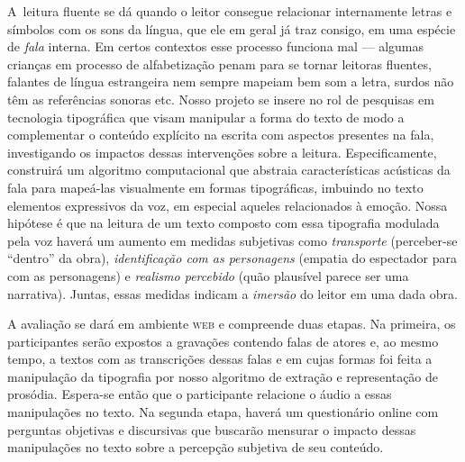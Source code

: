 \documentclass[a4paper,11pt,titlepage,singlespacing]{article}
\begin{document}
\newpage

\abstract

\noindent A~leitura fluente se dá quando o leitor consegue relacionar internamente letras e símbolos com os sons da língua, que ele em geral já traz consigo, em uma espécie de \textit{fala} interna. Em certos contextos esse processo funciona mal — algumas crianças em processo de alfabetização penam para se tornar leitoras fluentes, falantes de língua estrangeira nem sempre mapeiam bem som a letra, surdos não têm as referências sonoras etc. Nosso projeto se insere no rol de pesquisas em tecnologia tipográfica que visam manipular a forma do texto de modo a complementar o conteúdo explícito na escrita com aspectos presentes na fala, investigando os impactos dessas intervenções sobre a leitura. Especificamente, construirá um algoritmo computacional que abstraia características acústicas da fala para mapeá-las visualmente em formas tipográficas, imbuindo no texto elementos expressivos da voz, em especial aqueles relacionados à emoção. Nossa hipótese é que na leitura de um texto composto com essa tipografia modulada pela voz haverá um aumento em medidas subjetivas como \textit{transporte} (perceber-se ``dentro'' da obra), \textit{identificação com as personagens} (empatia do espectador para com as personagens) e \textit{realismo percebido} (quão plausível parece ser uma narrativa). Juntas, essas medidas indicam a \textit{imersão} do leitor em uma dada obra. 

A avaliação se dará em ambiente \textsc{web} e compreende duas etapas. Na primeira, os participantes serão expostos a gravações contendo falas de atores e, ao mesmo tempo, a textos com as transcrições dessas falas e em cujas formas foi feita a manipulação da tipografia por nosso algoritmo de extração e representação de prosódia. Espera-se então que o participante relacione o áudio a essas manipulações no texto. Na segunda etapa, haverá um questionário online com perguntas objetivas e discursivas que buscarão mensurar o impacto dessas manipulações no texto sobre a percepção subjetiva de seu conteúdo.
\end{document}
